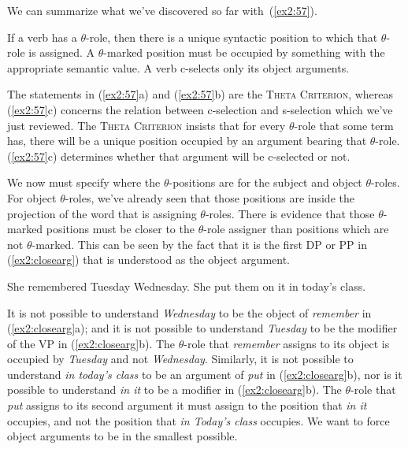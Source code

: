 We can summarize what we've discovered so far with~(\ref{ex2:57}).
\begin{exe}
	\ex \label{ex2:57} 
	\begin{xlist}
	\ex If a verb has a $\theta$-role, then there is a unique syntactic position to which that $\theta$-role is assigned.
	\ex A $\theta$-marked position must be occupied by something with the appropriate semantic value.
	\ex A verb c-selects only its object arguments.
	\end{xlist}
\end{exe}
The statements in (\ref{ex2:57}a) and (\ref{ex2:57}b) are the \textsc{Theta Criterion}, whereas (\ref{ex2:57}c) concerns the relation between \mbox{c-selection} and \mbox{s-selection} which we've just reviewed. The \textsc{Theta Criterion} insists that for every $\theta$-role that some term has, there will be a unique position occupied by an argument bearing that \mbox{$\theta$-role}. (\ref{ex2:57}c) determines whether that argument will be \mbox{c-selected} or not.

We now must specify where the $\theta$-positions are for the subject and object $\theta$-roles. For object $\theta$-roles, we've already seen that those positions are inside the  projection of the word that is assigning $\theta$-roles. There is evidence that those $\theta$-marked positions must be closer to the $\theta$-role assigner than positions which are not $\theta$-marked. This can be seen by the fact that it is the first DP or PP in (\ref{ex2:closearg}) that is understood as the object argument.
\enlargethispage*{\baselineskip}
\begin{exe}
	\raggedright
	\ex \label{ex2:closearg} 
	\begin{xlist}
		\ex She remembered Tuesday Wednesday.
		\ex She put them on it in today's class.
	\end{xlist}
\end{exe}
It is not possible to understand \emph{Wednesday} to be the object of \emph{remember} in (\ref{ex2:closearg}a); and it is not possible to understand \emph{Tuesday} to be the modifier of the VP in (\ref{ex2:closearg}b). The $\theta$-role that \emph{remember} assigns to its object is occupied by \emph{Tuesday} and not \emph{Wednesday}. Similarly, it is not possible to understand \emph{in today's class} to be an argument of \emph{put} in (\ref{ex2:closearg}b), nor is it possible to understand \emph{in it} to be a modifier in (\ref{ex2:closearg}b). The $\theta$-role that \emph{put} assigns to its second argument it must assign to the position that \emph{in it} occupies, and not the position that \emph{in Today's class} occupies. We want to force object arguments to be in the smallest  possible. 

